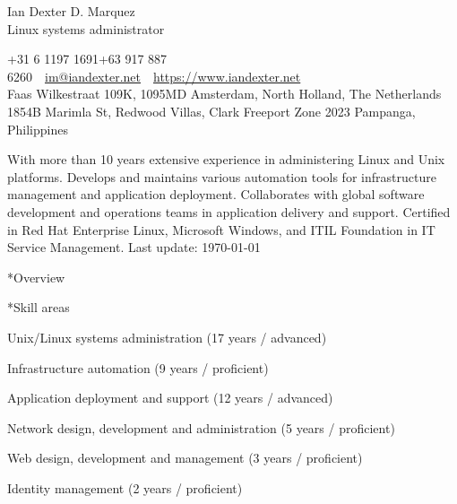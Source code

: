 \documentclass[10pt, a4paper, final]{article}
\begin{document}
\begin{center}
  \Huge Ian Dexter D. Marquez\\
  \Large Linux systems administrator
\end{center}

\begin{center}\begin{spacing}{1}\small
  +31 6 1197 1691+63 917 887 6260~\textbullet~\href{mailto:im@iandexter.net}{im@iandexter.net}~\textbullet~\href{https://www.iandexter.net}{https://www.iandexter.net}\\
  Faas Wilkestraat 109K, 1095MD Amsterdam, North Holland, The Netherlands\\
  1854B Marimla St, Redwood Villas, Clark Freeport Zone 2023 Pampanga, Philippines\\
  
\end{spacing}\end{center}
\vspace{1.5em}

\normalsize With more than 10 years extensive experience in administering Linux and Unix platforms. Develops and maintains various automation tools for infrastructure management and application deployment. Collaborates with global software development and operations teams in application delivery and support. Certified in Red Hat Enterprise Linux, Microsoft Windows, and ITIL Foundation in IT Service Management. \small \textcolor{dark-gray}{Last update: \textsc{\today}} \normalsize

\vspace{1em}

\begin{section}*{Overview}
  \begin{subsection}*{Skill areas}
    \begin{compactitem}
      \item Unix/Linux systems administration (17 years / advanced) 
      \item Infrastructure automation (9 years / proficient) 
      \item Application deployment and support (12 years / advanced) 
      \item Network design, development and administration (5 years / proficient) 
      \item Web design, development and management (3 years / proficient) 
      \item Identity management (2 years / proficient) 
    \end{compactitem}
  \end{subsection}
\end{section}
\end{document}
